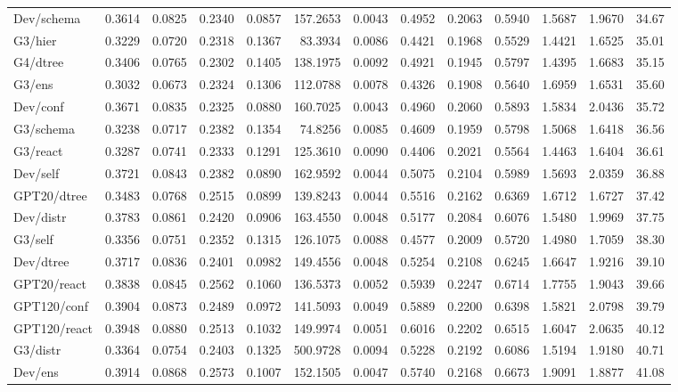 \begin{table}[t]
\begin{tabular}{lrrrrrrrrrrrr}
Dev/schema & 0.3614 & 0.0825 & 0.2340 & 0.0857 & 157.2653 & 0.0043 & 0.4952 & 0.2063 & 0.5940 & 1.5687 & 1.9670 & 34.67 \\
G3/hier & 0.3229 & 0.0720 & 0.2318 & 0.1367 & 83.3934 & 0.0086 & 0.4421 & 0.1968 & 0.5529 & 1.4421 & 1.6525 & 35.01 \\
G4/dtree & 0.3406 & 0.0765 & 0.2302 & 0.1405 & 138.1975 & 0.0092 & 0.4921 & 0.1945 & 0.5797 & 1.4395 & 1.6683 & 35.15 \\
G3/ens & 0.3032 & 0.0673 & 0.2324 & 0.1306 & 112.0788 & 0.0078 & 0.4326 & 0.1908 & 0.5640 & 1.6959 & 1.6531 & 35.60 \\
Dev/conf & 0.3671 & 0.0835 & 0.2325 & 0.0880 & 160.7025 & 0.0043 & 0.4960 & 0.2060 & 0.5893 & 1.5834 & 2.0436 & 35.72 \\
G3/schema & 0.3238 & 0.0717 & 0.2382 & 0.1354 & 74.8256 & 0.0085 & 0.4609 & 0.1959 & 0.5798 & 1.5068 & 1.6418 & 36.56 \\
G3/react & 0.3287 & 0.0741 & 0.2333 & 0.1291 & 125.3610 & 0.0090 & 0.4406 & 0.2021 & 0.5564 & 1.4463 & 1.6404 & 36.61 \\
Dev/self & 0.3721 & 0.0843 & 0.2382 & 0.0890 & 162.9592 & 0.0044 & 0.5075 & 0.2104 & 0.5989 & 1.5693 & 2.0359 & 36.88 \\
GPT20/dtree & 0.3483 & 0.0768 & 0.2515 & 0.0899 & 139.8243 & 0.0044 & 0.5516 & 0.2162 & 0.6369 & 1.6712 & 1.6727 & 37.42 \\
Dev/distr & 0.3783 & 0.0861 & 0.2420 & 0.0906 & 163.4550 & 0.0048 & 0.5177 & 0.2084 & 0.6076 & 1.5480 & 1.9969 & 37.75 \\
G3/self & 0.3356 & 0.0751 & 0.2352 & 0.1315 & 126.1075 & 0.0088 & 0.4577 & 0.2009 & 0.5720 & 1.4980 & 1.7059 & 38.30 \\
Dev/dtree & 0.3717 & 0.0836 & 0.2401 & 0.0982 & 149.4556 & 0.0048 & 0.5254 & 0.2108 & 0.6245 & 1.6647 & 1.9216 & 39.10 \\
GPT20/react & 0.3838 & 0.0845 & 0.2562 & 0.1060 & 136.5373 & 0.0052 & 0.5939 & 0.2247 & 0.6714 & 1.7755 & 1.9043 & 39.66 \\
GPT120/conf & 0.3904 & 0.0873 & 0.2489 & 0.0972 & 141.5093 & 0.0049 & 0.5889 & 0.2200 & 0.6398 & 1.5821 & 2.0798 & 39.79 \\
GPT120/react & 0.3948 & 0.0880 & 0.2513 & 0.1032 & 149.9974 & 0.0051 & 0.6016 & 0.2202 & 0.6515 & 1.6047 & 2.0635 & 40.12 \\
G3/distr & 0.3364 & 0.0754 & 0.2403 & 0.1325 & 500.9728 & 0.0094 & 0.5228 & 0.2192 & 0.6086 & 1.5194 & 1.9180 & 40.71 \\
Dev/ens & 0.3914 & 0.0868 & 0.2573 & 0.1007 & 152.1505 & 0.0047 & 0.5740 & 0.2168 & 0.6673 & 1.9091 & 1.8877 & 41.08 \\

\end{tabular}
\end{table}
